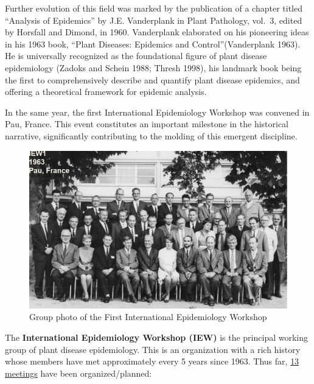 \documentclass[
  letterpaper,
]{book}
\begin{document}
Further evolution of this field was marked by the publication of a
chapter titled ``Analysis of Epidemics'' by J.E. Vanderplank in Plant
Pathology, vol.~3, edited by Horsfall and Dimond, in 1960. Vanderplank
elaborated on his pioneering ideas in his 1963 book, ``Plant Diseases:
Epidemics and Control''(Vanderplank 1963). He is universally recognized
as the foundational figure of plant disease epidemiology (Zadoks and
Schein 1988; Thresh 1998), his landmark book being the first to
comprehensively describe and quantify plant disease epidemics, and
offering a theoretical framework for epidemic analysis.

In the same year, the first International Epidemiology Workshop was
convened in Pau, France. This event constitutes an important milestone
in the historical narrative, significantly contributing to the molding
of this emergent discipline.

\begin{figure}

{\centering \includegraphics[width=5.38542in,height=\textheight]{imgs/iew1.png}

}

\caption{\label{fig-iew1}Group photo of the First International
Epidemiology Workshop}

\end{figure}

The \textbf{International Epidemiology Workshop (IEW)} is the principal
working group of plant disease epidemiology. This is an organization
with a rich history whose members have met approximately every 5 years
since 1963. Thus far, \href{https://iew13.net/about.html}{13 meetings}
have been organized/planned:
\end{document}
